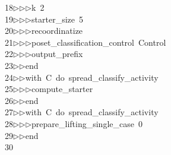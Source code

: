 \begin{tabbing}
18\>$\triangleright$\>$\triangleright$\>$\triangleright$\>k\ 2\ \\[0pt]
19\>$\triangleright$\>$\triangleright$\>$\triangleright$\>starter\_size\ 5\ \\[0pt]
20\>$\triangleright$\>$\triangleright$\>$\triangleright$\>recoordinatize\ \\[0pt]
21\>$\triangleright$\>$\triangleright$\>$\triangleright$\>poset\_classification\_control\ Control\ \\[0pt]
22\>$\triangleright$\>$\triangleright$\>$\triangleright$\>output\_prefix\ \ \\[0pt]
23\>$\triangleright$\>$\triangleright$\>end\ \\[0pt]
24\>$\triangleright$\>$\triangleright$\>with\ C\ do\ spread\_classify\_activity\ \\[0pt]
25\>$\triangleright$\>$\triangleright$\>$\triangleright$\>compute\_starter\ \\[0pt]
26\>$\triangleright$\>$\triangleright$\>end\ \\[0pt]
27\>$\triangleright$\>$\triangleright$\>with\ C\ do\ spread\_classify\_activity\ \\[0pt]
28\>$\triangleright$\>$\triangleright$\>$\triangleright$\>prepare\_lifting\_single\_case\ 0\ \\[0pt]
29\>$\triangleright$\>$\triangleright$\>end\\[0pt]
30\>\end{tabbing}
